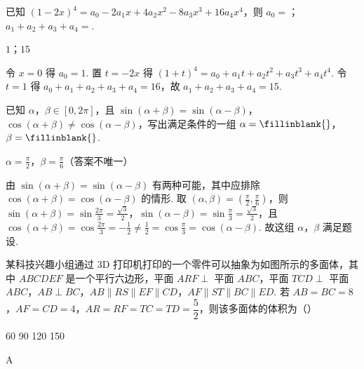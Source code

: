 \documentclass[UTF8,a4paper,oneside,11pt]{ctexbook}
\begin{document}
\begin{problem}
已知 \((1-2x)^4=a_0-2a_1x+4a_2x^2-8a_3x^3+16a_4x^4\)，则 \(a_0=\)；\(a_1+a_2+a_3+a_4=\)\fillinblank{}.
\end{problem}

\begin{answer}
\(1\)；\(15\)
\end{answer}

\begin{solution}
令 \(x=0\) 得 \(a_0=1\). 置 \(t=-2x\) 得 \((1+t)^4=a_0+a_1t+a_2t^2+a_3t^3+a_4t^4\). 令 \(t=1\) 得 \(a_0+a_1+a_2+a_3+a_4=16\)，故 \(a_1+a_2+a_3+a_4=15\).
\end{solution}

\begin{problem}
已知 \(\alpha\)，\(\beta\in[0,2\pi]\)，且 \(\sin(\alpha+\beta)=\sin(\alpha-\beta)\)，\(\cos(\alpha+\beta)\ne\cos(\alpha-\beta)\)，写出满足条件的一组 \(\alpha=\fillinblank{}\)，\(\beta=\fillinblank{}\).
\end{problem}

\begin{answer}
\(\alpha=\frac{\pi}{2}\)，\(\beta=\frac{\pi}{6}\)（答案不唯一）
\end{answer}

\begin{solution}
由 \(\sin(\alpha+\beta)=\sin(\alpha-\beta)\) 有两种可能，其中应排除 \(\cos(\alpha+\beta)=\cos(\alpha-\beta)\) 的情形. 取 \((\alpha,\beta)=\left(\frac{\pi}{2},\frac{\pi}{6}\right)\)，则
\(\sin(\alpha+\beta)=\sin\frac{2\pi}{3}=\frac{\sqrt3}{2}\)，\(\sin(\alpha-\beta)=\sin\frac{\pi}{3}=\frac{\sqrt3}{2}\)，且 \(\cos(\alpha+\beta)=\cos\frac{2\pi}{3}=-\frac12\ne\frac12=\cos\frac{\pi}{3}=\cos(\alpha-\beta)\).
故这组 \(\alpha\)，\(\beta\) 满足题设.
\end{solution}

\begin{problem}
某科技兴趣小组通过 3D 打印机打印的一个零件可以抽象为如图所示的多面体，其中 \(ABCDEF\) 是一个平行六边形，平面 \(ARF\perp\) 平面 \(ABC\)，平面 \(TCD\perp\) 平面 \(ABC\)，\(AB\perp BC\)，\(AB\parallel RS\parallel EF\parallel CD\)，\(AF\parallel ST\parallel BC\parallel ED\). 若 \(AB=BC=8\)，\(AF=CD=4\)，\(AR=RF=TC=TD=\dfrac52\)，则该多面体的体积为（\quad）


\choices
    {60}
    {90}
    {120}
    {150}
\end{problem}

\begin{answer}
A
\end{answer}
\end{document}
